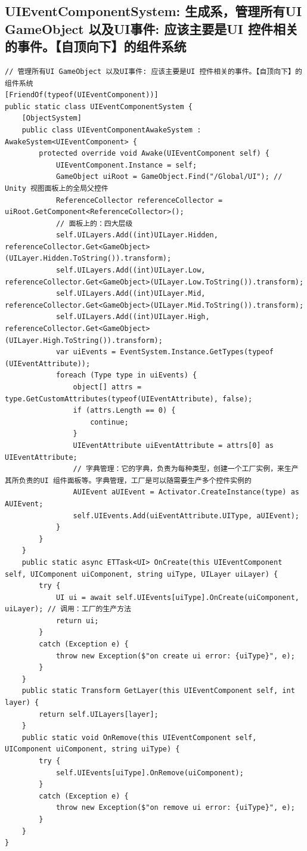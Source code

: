 \documentclass[9pt, b5paper]{article}
\begin{document}
\subsection{UIEventComponentSystem: 生成系，管理所有UI GameObject 以及UI事件: 应该主要是UI 控件相关的事件。【自顶向下】的组件系统}
\label{sec-7-9}
\begin{verbatim}
// 管理所有UI GameObject 以及UI事件: 应该主要是UI 控件相关的事件。【自顶向下】的组件系统
[FriendOf(typeof(UIEventComponent))]
public static class UIEventComponentSystem {
    [ObjectSystem]
    public class UIEventComponentAwakeSystem : AwakeSystem<UIEventComponent> {
        protected override void Awake(UIEventComponent self) {
            UIEventComponent.Instance = self;
            GameObject uiRoot = GameObject.Find("/Global/UI"); // Unity 视图面板上的全局父控件 
            ReferenceCollector referenceCollector = uiRoot.GetComponent<ReferenceCollector>();
            // 面板上的：四大层级
            self.UILayers.Add((int)UILayer.Hidden, referenceCollector.Get<GameObject>(UILayer.Hidden.ToString()).transform);
            self.UILayers.Add((int)UILayer.Low, referenceCollector.Get<GameObject>(UILayer.Low.ToString()).transform);
            self.UILayers.Add((int)UILayer.Mid, referenceCollector.Get<GameObject>(UILayer.Mid.ToString()).transform);
            self.UILayers.Add((int)UILayer.High, referenceCollector.Get<GameObject>(UILayer.High.ToString()).transform);
            var uiEvents = EventSystem.Instance.GetTypes(typeof (UIEventAttribute));
            foreach (Type type in uiEvents) {
                object[] attrs = type.GetCustomAttributes(typeof(UIEventAttribute), false);
                if (attrs.Length == 0) {
                    continue;
                }
                UIEventAttribute uiEventAttribute = attrs[0] as UIEventAttribute;
                // 字典管理：它的字典，负责为每种类型，创建一个工厂实例，来生产其所负责的UI 组件面板等。字典管理，工厂是可以随需要生产多个控件实例的
                AUIEvent aUIEvent = Activator.CreateInstance(type) as AUIEvent;
                self.UIEvents.Add(uiEventAttribute.UIType, aUIEvent);
            }
        }
    }
    public static async ETTask<UI> OnCreate(this UIEventComponent self, UIComponent uiComponent, string uiType, UILayer uiLayer) {
        try {
            UI ui = await self.UIEvents[uiType].OnCreate(uiComponent, uiLayer); // 调用：工厂的生产方法 
            return ui;
        }
        catch (Exception e) {
            throw new Exception($"on create ui error: {uiType}", e);
        }
    }
    public static Transform GetLayer(this UIEventComponent self, int layer) {
        return self.UILayers[layer];
    }
    public static void OnRemove(this UIEventComponent self, UIComponent uiComponent, string uiType) {
        try {
            self.UIEvents[uiType].OnRemove(uiComponent);
        }
        catch (Exception e) {
            throw new Exception($"on remove ui error: {uiType}", e);
        }
    }
}
\end{verbatim}
\end{document}
